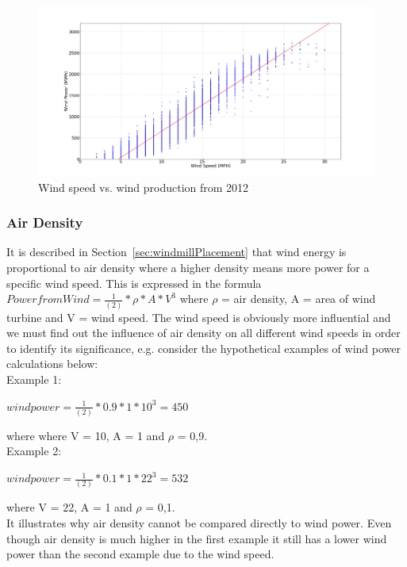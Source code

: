 \begin{figure}[H]
\centering
\includegraphics[width=0.95\linewidth]{billeder/WindSpeedVsProduction.png}
\caption{Wind speed vs. wind production from 2012}
\label{fig:windVsProd}
\end{figure}

\subsubsection{Air Density}
\label{sec:airDensity}
It is described in Section~\ref{sec:windmillPlacement} that wind energy is proportional to air density where a higher density means more power for a specific wind speed. This is expressed in the formula $Power from Wind=\frac{1}{(2)}*\rho*A*V^3$ where $\rho$ = air density, A = area of wind turbine and V = wind speed. The wind speed is obviously more influential and we must find out the influence of air density on all different wind speeds in order to identify its significance, e.g. consider the hypothetical examples of wind power calculations below:
\\[0.5cm]
\noindent Example 1:

\begin{center}
$wind power = \frac{1}{(2)}*0.9*1*10^3 = 450$
\end{center}

\noindent where where V = 10, A = 1 and $\rho$ =  0,9.
\\[0.5cm]
\noindent Example 2: 

\begin{center}
$wind power = \frac{1}{(2)}*0.1*1*22^3 = 532$
\end{center}

\noindent where V = 22, A = 1 and $\rho$ =  0,1.
\\[0.5cm]
\noindent It illustrates why air density cannot be compared directly to wind power. Even though air density is much higher in the first example it still has a lower wind power than the second example due to the wind speed.

